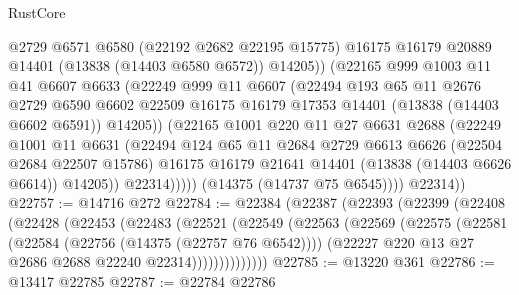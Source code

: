 \begin{lexlean}{RustCore}
\begin{coremodule}
                      @2729
                      @6571
                      @6580
                      (@22192 @2682 @22195 @15775)
                      @16175
                      @16179
                      @20889
                      @14401
                      (@13838 (@14403 @6580 @6572))
                      @14205))
                  (@22165
                    @999
                    @1003
                    @11
                    @41
                    @6607
                    @6633
                    (@22249
                      @999
                      @11
                      @6607
                      (@22494
                        @193
                        @65
                        @11
                        @2676
                        @2729
                        @6590
                        @6602
                        @22509
                        @16175
                        @16179
                        @17353
                        @14401
                        (@13838 (@14403 @6602 @6591))
                        @14205))
                    (@22165
                      @1001
                      @220
                      @11
                      @27
                      @6631
                      @2688
                      (@22249
                        @1001
                        @11
                        @6631
                        (@22494
                          @124
                          @65
                          @11
                          @2684
                          @2729
                          @6613
                          @6626
                          (@22504 @2684 @22507 @15786)
                          @16175
                          @16179
                          @21641
                          @14401
                          (@13838 (@14403 @6626 @6614))
                          @14205))
                      @22314)))))
            (@14375 (@14737 @75 @6545))))
        @22314))
@22757 := @14716 @272
@22784 := @22384
    (@22387
      (@22393
        (@22399
          (@22408
            (@22428
              (@22453
                (@22483
                  (@22521
                    (@22549
                      (@22563
                        (@22569
                          (@22575
                            (@22581
                              (@22584 (@22756 (@14375 (@22757 @76 @6542))))
                              (@22227 @220 @13 @27 @2686 @2688 @22240 @22314))))))))))))))
@22785 := @13220 @361
@22786 := @13417 @22785
@22787 := @22784 @22786

\end{coremodule}
\end{lexlean}
